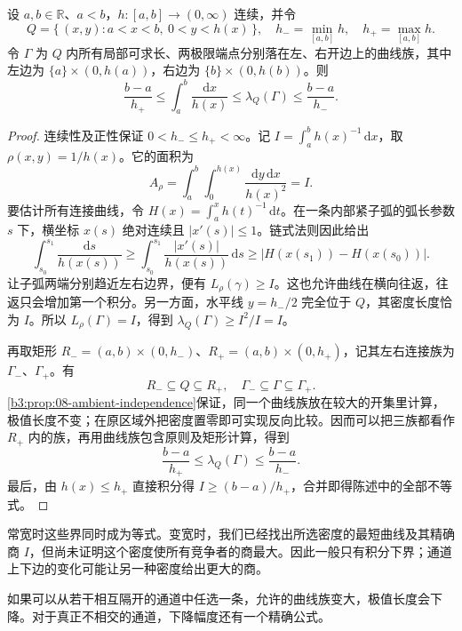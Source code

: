 \begin{proposition}[变宽通道的下界与夹逼]\label{b3:prop:08-variable-channel}
设 \(a,b\in\mathbb R\)、\(a<b\)，\(h:[a,b]\rightarrow(0,\infty)\) 连续，并令
\[
 Q=\{\,(x,y):a<x<b,\ 0<y<h(x)\,\},\quad
 h_-=\min_{[a,b]}h,\quad h_+=\max_{[a,b]}h.
\]
令 \(\Gamma\) 为 \(Q\) 内所有局部可求长、两极限端点分别落在左、右开边上的曲线族，其中左边为 \(\{a\}\times(0,h(a))\)，右边为 \(\{b\}\times(0,h(b))\)。则
\[
 \frac{b-a}{h_+}
 \le\int_a^b\frac{\mathrm dx}{h(x)}
 \le\lambda_Q(\Gamma)
 \le\frac{b-a}{h_-}.
\]
\end{proposition}
\begin{proof}
连续性及正性保证 \(0<h_-\le h_+<\infty\)。记 \(I=\int_a^b h(x)^{-1}\,\mathrm dx\)，取 \(\rho(x,y)=1/h(x)\)。它的面积为
\[
 A_\rho=\int_a^b\int_0^{h(x)}\frac{\mathrm dy\,\mathrm dx}{h(x)^2}=I.
\]
要估计所有连接曲线，令 \(H(x)=\int_a^x h(t)^{-1}\,\mathrm dt\)。在一条内部紧子弧的弧长参数 \(s\) 下，横坐标 \(x(s)\) 绝对连续且 \(|x'(s)|\le1\)。链式法则因此给出
\[
 \int_{s_0}^{s_1}\frac{\mathrm ds}{h(x(s))}
 \ge\int_{s_0}^{s_1}\frac{|x'(s)|}{h(x(s))}\,\mathrm ds
 \ge\bigl|H(x(s_1))-H(x(s_0))\bigr|.
\]
让子弧两端分别趋近左右边界，便有 \(L_\rho(\gamma)\ge I\)。这也允许曲线在横向往返，往返只会增加第一个积分。另一方面，水平线 \(y=h_-/2\) 完全位于 \(Q\)，其密度长度恰为 \(I\)。所以 \(L_\rho(\Gamma)=I\)，得到 \(\lambda_Q(\Gamma)\ge I^2/I=I\)。

再取矩形 \(R_-=(a,b)\times(0,h_-)\)、\(R_+=(a,b)\times(0,h_+)\)，记其左右连接族为 \(\Gamma_-\)、\(\Gamma_+\)。有
\[
 R_-\subseteq Q\subseteq R_+,\quad
 \Gamma_-\subseteq\Gamma\subseteq\Gamma_+.
\]
\cref{b3:prop:08-ambient-independence}保证，同一个曲线族放在较大的开集里计算，极值长度不变；在原区域外把密度置零即可实现反向比较。因而可以把三族都看作 \(R_+\) 内的族，再用曲线族包含原则及矩形计算，得到
\[
 \frac{b-a}{h_+}\le\lambda_Q(\Gamma)\le\frac{b-a}{h_-}.
\]
最后，由 \(h(x)\le h_+\) 直接积分得 \(I\ge(b-a)/h_+\)，合并即得陈述中的全部不等式。
\end{proof}

常宽时这些界同时成为等式。变宽时，我们已经找出所选密度的最短曲线及其精确商 \(I\)，但尚未证明这个密度使所有竞争者的商最大。因此一般只有积分下界；通道上下边的变化可能让另一种密度给出更大的商。

\ProseParagraphBreak
如果可以从若干相互隔开的通道中任选一条，允许的曲线族变大，极值长度会下降。对于真正不相交的通道，下降幅度还有一个精确公式。

